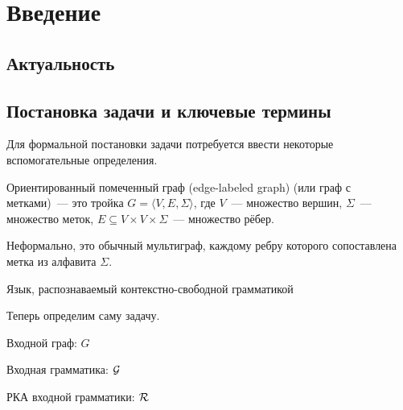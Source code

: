 \section*{Введение}


\subsection*{Актуальность}

\subsection*{Постановка задачи и ключевые термины}

Для формальной постановки задачи потребуется ввести некоторые вспомогательные определения.

\begin{definition}
    Ориентированный помеченный граф (edge-labeled graph) (или граф с метками)~--- это тройка $G = \langle V, E, \Sigma \rangle$, где $V$~--- множество вершин, $\Sigma$~--- множество меток, $E \subseteq V \times V \times \Sigma$~--- множество рёбер. 

    Неформально, это обычный мультиграф, каждому ребру которого сопоставлена метка из алфавита $\Sigma$.
\end{definition}

\begin{definition}

\end{definition}

\begin{definition}
    Язык, распознаваемый контекстно-свободной грамматикой

\end{definition}

Теперь определим саму задачу.

\begin{definition}
    Входной граф: $G$

    Входная грамматика: $\mathcal{G}$

    РКА входной грамматики: $\mathcal{R}$


\end{definition}

